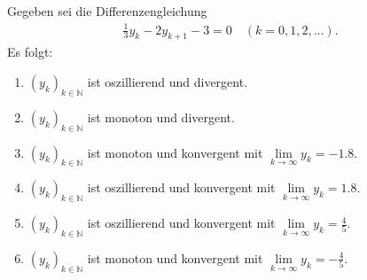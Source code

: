 \subsection*{}
Gegeben sei die Differenzengleichung
\begin{align*}
\frac{1}{3} y_k
-
2 y_{k+1}
-3
=0
\quad (k = 0,1,2,...).
\end{align*}
Es folgt:
\renewcommand{\labelenumi}{(\alph{enumi})}
\begin{enumerate}
	\item
	$ (y_k)_{k \in \mathbb{N}} $ ist oszillierend und divergent.
	\item
	$ (y_k)_{k \in \mathbb{N}} $ ist monoton und divergent.	
	\item 
	$ (y_k)_{k \in \mathbb{N}} $ ist monoton und konvergent mit $ \lim \limits_{k \to \infty} y_k = -1.8$.
	\item
	$ (y_k)_{k \in \mathbb{N}} $ ist oszillierend und konvergent mit $ \lim \limits_{k \to \infty} y_k = 1.8$.
	\item 
	$ (y_k)_{k \in \mathbb{N}} $ ist oszillierend und konvergent mit $ \lim \limits_{k \to \infty} y_k = \frac{4}{5}$.
	\item 
	$ (y_k)_{k \in \mathbb{N}} $ ist monoton und konvergent mit $ \lim \limits_{k \to \infty} y_k = -\frac{4}{5}$.
\end{enumerate}